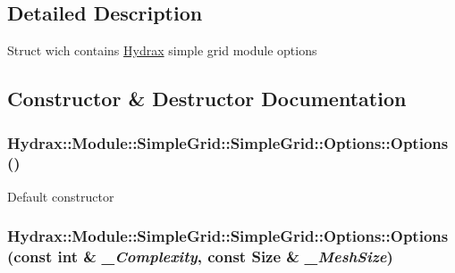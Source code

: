 \subsection{Detailed Description}
Struct wich contains \hyperlink{class_hydrax_1_1_hydrax}{Hydrax} simple grid module options 

\subsection{Constructor \& Destructor Documentation}
\hypertarget{struct_hydrax_1_1_module_1_1_simple_grid_1_1_options_e94dd7d6ad74998702368e88b44c35da}{
\subsubsection[{Options}]{\setlength{\rightskip}{0pt plus 5cm}Hydrax::Module::SimpleGrid::SimpleGrid::Options::Options ()}}
\label{struct_hydrax_1_1_module_1_1_simple_grid_1_1_options_e94dd7d6ad74998702368e88b44c35da}


Default constructor \hypertarget{struct_hydrax_1_1_module_1_1_simple_grid_1_1_options_dfe5943bb6ad1703de7b40a721e3c316}{
\subsubsection[{Options}]{\setlength{\rightskip}{0pt plus 5cm}Hydrax::Module::SimpleGrid::SimpleGrid::Options::Options (const int \& {\em \_\-Complexity}, \/  const {\bf Size} \& {\em \_\-MeshSize})}}
\label{struct_hydrax_1_1_module_1_1_simple_grid_1_1_options_dfe5943bb6ad1703de7b40a721e3c316}


